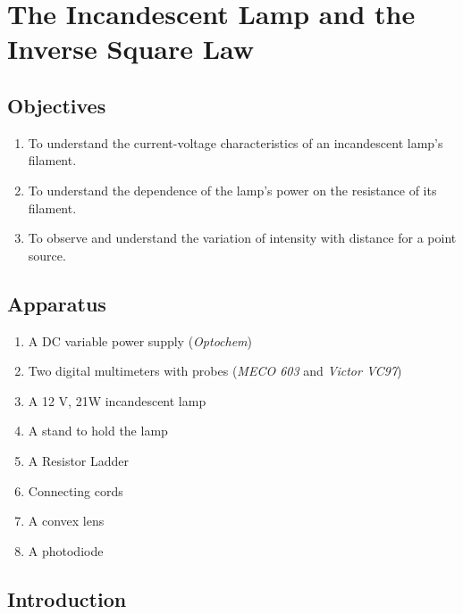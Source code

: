 
\chapter{The Incandescent Lamp and the Inverse Square Law}

\section*{Objectives}

\begin{enumerate}
\item To understand the current-voltage characteristics of an incandescent lamp's filament.
\item To understand the dependence of the lamp's power on the resistance of its filament.
\item To observe and understand the variation of intensity with distance for a point source.
\end{enumerate}




\section*{Apparatus}

\begin{enumerate}
\item A DC variable power supply (\textit{Optochem})
\item Two digital multimeters with probes (\textit{MECO 603} and \textit{Victor VC97})
\item A 12 V, 21W incandescent lamp
\item A stand to hold the lamp
\item A Resistor Ladder
\item Connecting cords
\item A convex lens
\item A photodiode

\end{enumerate}


\section*{Introduction}

